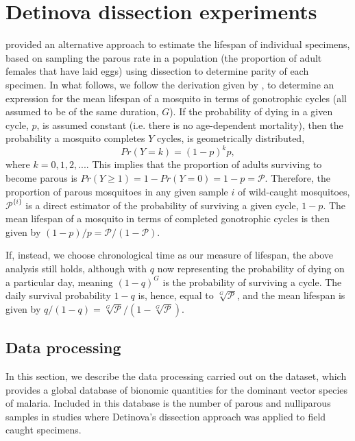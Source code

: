 \documentclass[12pt]{article}
\begin{document}
{\section{Detinova dissection experiments}\label{sec:detinova}
\cite{detinova1962age} provided an alternative approach to estimate the lifespan of individual specimens, based on sampling the parous rate in a population (the proportion of adult females that have laid eggs) using dissection to determine parity of each specimen. In what follows, we follow the derivation given by \cite{davidson1954estimation}, to determine an expression for the mean lifespan of a mosquito in terms of gonotrophic cycles (all assumed to be of the same duration, $G$). If the probability of dying in a given cycle, $p$, is assumed constant (i.e. there is no age-dependent mortality), then the probability a mosquito completes $Y$ cycles, is geometrically distributed,
%
\begin{equation}
Pr(Y=k) = (1-p)^k p,
\end{equation}
%
where $k= 0,1,2,...$. This implies that the proportion of adults surviving to become parous is $Pr(Y\geq 1) = 1 - Pr(Y=0) = 1-p=\mathcal{P}$. Therefore, the proportion of parous mosquitoes in any given sample $i$ of wild-caught mosquitoes, $\mathcal{P}^{\{i\}}$ is a direct estimator of the probability of surviving a given cycle, $1-p$. The mean lifespan of a mosquito in terms of completed gonotrophic cycles is then given by $(1-p)/p= \mathcal{P}/(1-\mathcal{P})$.

If, instead, we choose chronological time as our measure of lifespan, the above analysis still holds, although with $q$ now representing the probability of dying on a particular day, meaning $(1-q)^G$ is the probability of surviving a cycle. The daily survival probability $1-q$ is, hence, equal to $\sqrt[G]{\mathcal{P}}$, and the mean lifespan is given by $q/(1-q)=\sqrt[G]{\mathcal{P}}/(1-\sqrt[G]{\mathcal{P}})$.

\subsection{Data processing}
In this section, we describe the data processing carried out on the \cite{massey2016global} dataset, which provides a global database of bionomic quantities for the dominant vector species of malaria. Included in this database is the number of parous and nulliparous samples in studies where Detinova's dissection approach was applied to field caught specimens.

}
\end{document}
